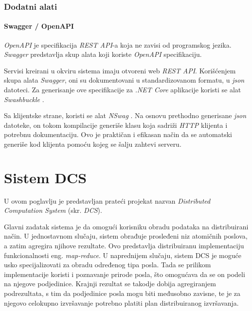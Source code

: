 \documentclass[12pt,oneside]{memoir}
\begin{document}
\subsection{Dodatni alati}

\subsubsection{Swagger / OpenAPI}

\emph{OpenAPI} \cite{OpenAPI} je specifikacija \emph{REST API}-a koja ne zavisi od programskog jezika. \emph{Swagger} \cite{Swagger} predstavlja skup alata koji koriste \emph{OpenAPI} specifikaciju.

Servisi kreirani u okviru sistema imaju otvoreni web \emph{REST API}. Korišćenjem skupa alata \emph{Swagger}, oni su dokumentovani u standardizovanom formatu, u \emph{json} datoteci. Za generisanje ove specifikacije za \emph{.NET Core} aplikacije koristi se alat \emph{Swashbuckle} \cite{Swashbuckle}.

Sa klijentske strane, koristi se alat \emph{NSwag} \cite{NSwag}. Na osnovu prethodno generisane \emph{json} datoteke, on tokom kompilacije generiše klasu koja sadriži \emph{HTTP} klijenta i potrebnu dokumentaciju. Ovo je praktičan i efikasan način da se automatski generiše kod klijenta pomoću kojeg se šalju zahtevi serveru.



\chapter{Sistem DCS}
\label{chp:sistemdcs}

U ovom poglavlju je predstavljan prateći projekat nazvan \emph{Distributed Computation System} (skr. \emph{DCS}).

Glavni zadatak sistema je da omogući korisniku obradu podataka na distribuirani način.
U jednostavnom slučaju, sistem obrađuje prosleđeni niz atomičnih poslova, a zatim agregira njihove rezultate. Ovo predstavlja distribuiranu implementaciju funkcionalnosti eng. \emph{map-reduce}.
U naprednijem slučaju, sistem DCS je moguće usko specijalizovati za obradu određenog tipa posla. Tada se prilikom implementacije koristi i poznavanje prirode posla, što omogućava da se on podeli na njegove podjedinice. Krajnji rezultat se takodje dobija agregiranjem podrezultata, s tim da podjedinice posla mogu biti međusobno zavisne, te je za njegovo celokupno izvršavanje potrebno platiti plan distribuiranog izvršavanja.
\end{document}
